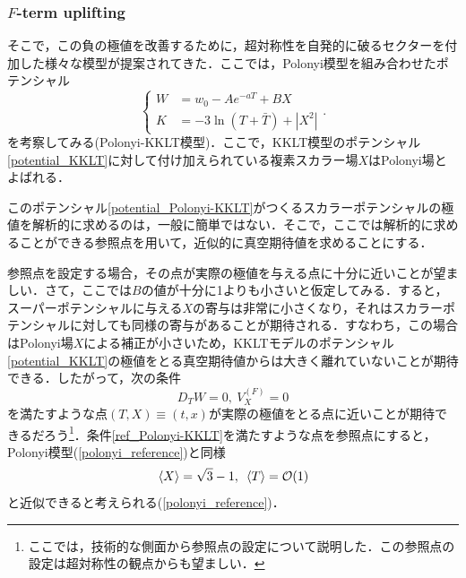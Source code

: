 \documentclass[a4paper,uplatex,dvipdfmx,10pt]{jsarticle}
\theoremstyle{definition}
\begin{document}
\subsubsection*{\texorpdfstring{$F$}{F}-term uplifting}

そこで，この負の極値を改善するために，超対称性を自発的に破るセクターを付加した様々な模型が提案されてきた．ここでは，Polonyi模型\cite{Polonyi_GeneralizationMassive_1977}を組み合わせたポテンシャル
\begin{equation}
   \left\{
      \begin{alignedat}{1}
         W
         &=
         w_{0}
         -
         Ae^{-aT}
         +
         BX
         \\
         K
         &=
         -
         3\ln(T+\bar{T})
         +
         |X^2|
      \end{alignedat}
   \right.
   .
   \label{potential_Polonyi-KKLT}
\end{equation}
を考察してみる(Polonyi-KKLT模型)．ここで，KKLT模型のポテンシャル\eqref{potential_KKLT}に対して付け加えられている複素スカラー場$X$はPolonyi場とよばれる．

このポテンシャル\eqref{potential_Polonyi-KKLT}がつくるスカラーポテンシャルの極値を解析的に求めるのは，一般に簡単ではない．そこで，ここでは解析的に求めることができる参照点を用いて，近似的に真空期待値を求めることにする．

参照点を設定する場合，その点が実際の極値を与える点に十分に近いことが望ましい．さて，ここでは$B$の値が十分に1よりも小さいと仮定してみる．すると，スーパーポテンシャルに与える$X$の寄与は非常に小さくなり，それはスカラーポテンシャルに対しても同様の寄与があることが期待される．すなわち，この場合はPolonyi場$X$による補正が小さいため，KKLTモデルのポテンシャル\eqref{potential_KKLT}の極値をとる真空期待値からは大きく離れていないことが期待できる．したがって，次の条件
\begin{equation}
   D_{T}W
   =
   0
   ,\ 
   V^{(F)}_{X}
   =
   0
   \label{ref_Polonyi-KKLT}
\end{equation}
を満たすような点$(T,X)\equiv(t,x)$が実際の極値をとる点に近いことが期待できるだろう\footnote{
   ここでは，技術的な側面から参照点の設定について説明した．この参照点の設定は超対称性の観点からも望ましい．
}．条件\eqref{ref_Polonyi-KKLT}を満たすような点を参照点にすると，Polonyi模型(\ref{polonyi_reference})と同様
\begin{equation}
   \ev*{X}
   =
   \sqrt{3}-1
   ,\ 
   \ev*{T}
   =
   \mathcal{O}(1)
   \label{ref_point}
\end{equation}
と近似できると考えられる(\ref{polonyi_reference})．
\end{document}
